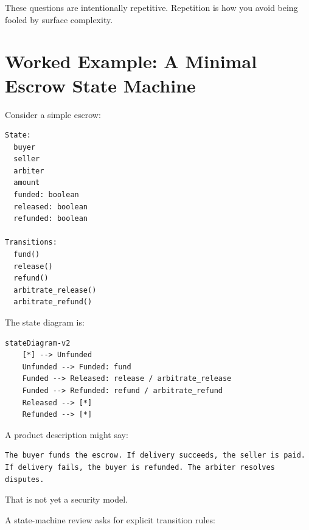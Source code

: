 These questions are intentionally repetitive. Repetition is how you
avoid being fooled by surface complexity.

\section{Worked Example: A Minimal Escrow State Machine}

Consider a simple escrow:

\begin{lstlisting}
State:
  buyer
  seller
  arbiter
  amount
  funded: boolean
  released: boolean
  refunded: boolean

Transitions:
  fund()
  release()
  refund()
  arbitrate_release()
  arbitrate_refund()
\end{lstlisting}

The state diagram is:

\begin{lstlisting}
stateDiagram-v2
    [*] --> Unfunded
    Unfunded --> Funded: fund
    Funded --> Released: release / arbitrate_release
    Funded --> Refunded: refund / arbitrate_refund
    Released --> [*]
    Refunded --> [*]
\end{lstlisting}

A product description might say:

\begin{lstlisting}
The buyer funds the escrow. If delivery succeeds, the seller is paid.
If delivery fails, the buyer is refunded. The arbiter resolves disputes.
\end{lstlisting}

That is not yet a security model.

A state-machine review asks for explicit transition rules:

